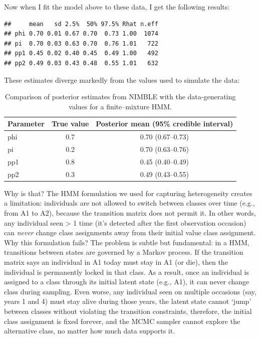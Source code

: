 \documentclass[
  12pt,
]{krantz}
\begin{document}
Now when I fit the model above to these data, I get the following results:

\begin{verbatim}
##     mean   sd 2.5%  50% 97.5% Rhat n.eff
## phi 0.70 0.01 0.67 0.70  0.73 1.00  1074
## pi  0.70 0.03 0.63 0.70  0.76 1.01   722
## pp1 0.45 0.02 0.40 0.45  0.49 1.00   492
## pp2 0.49 0.03 0.43 0.48  0.55 1.01   632
\end{verbatim}

These estimates diverge markedly from the values used to simulate the data:

\begin{table}

\caption{\label{tab:unnamed-chunk-393}Comparison of posterior estimates from NIMBLE with the data-generating values for a finite--mixture HMM.}
\centering
\begin{tabular}[t]{l|c|c}
\hline
Parameter & True value & Posterior mean (95\% credible interval)\\
\hline
phi & 0.7 & 0.70 (0.67–0.73)\\
\hline
pi & 0.2 & 0.70 (0.63–0.76)\\
\hline
pp1 & 0.8 & 0.45 (0.40–0.49)\\
\hline
pp2 & 0.3 & 0.49 (0.43–0.55)\\
\hline
\end{tabular}
\end{table}

Why is that? The HMM formulation we used for capturing heterogeneity creates a limitation: individuals are not allowed to switch between classes over time (e.g., from A1 to A2), because the transition matrix does not permit it. In other words, any individual seen \textgreater{} 1 time (it's detected after the first observation occasion) can \emph{never} change class assignments away from their initial value class assignment. Why this formulation fails? The problem is subtle but fundamental: in a HMM, transitions between states are governed by a Markov process. If the transition matrix says an individual in A1 today must stay in A1 (or die), then the individual is permanently locked in that class. As a result, once an individual is assigned to a class through its initial latent state (e.g., A1), it can never change class during sampling. Even worse, any individual seen on multiple occasions (say, years 1 and 4) must stay alive during those years, the latent state cannot `jump' between classes without violating the transition constraints, therefore, the initial class assignment is fixed forever, and the MCMC sampler cannot explore the alternative class, no matter how much data supports it.
\end{document}

